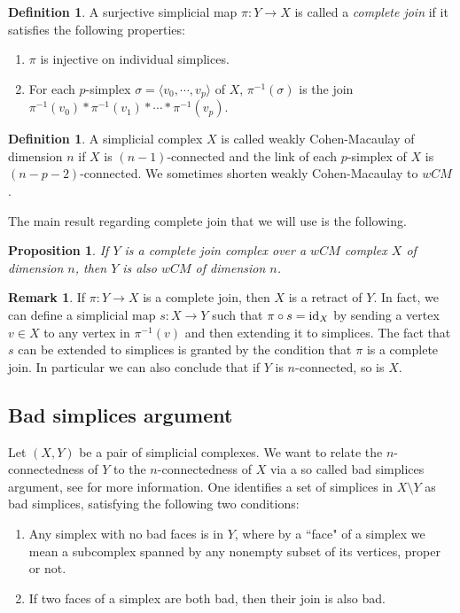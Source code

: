 \documentclass[11pt, a4paper]{amsart}
\newtheorem{prop}[thm]{Proposition}
\theoremstyle{definition}
\newtheorem{rem}[thm]{Remark}
\newtheorem{defn}[thm]{Definition} %
\newcommand{\id}{{{\rm id}}}
\begin{document}
\begin{defn}
A surjective simplicial map $\pi: Y\to X$ is called a \emph{complete join} if it satisfies the following properties:
\begin{enumerate} [label=(\arabic*)]
    \item $\pi$ is injective on individual simplices. 
    \item For each $p$-simplex $\sigma = \langle v_0,\cdots,v_p\rangle$ of $X$, $\pi^{-1}(\sigma)$ is the join $\pi^{-1}(v_0)\ast \pi^{-1}(v_1)\ast\cdots\ast \pi^{-1}(v_p)$.
 \end{enumerate}
\end{defn}


\begin{defn}
A simplicial complex  $X$ is called weakly Cohen-Macaulay of dimension $n$ if $X$ is $(n-1)$-connected and the link of each $p$-simplex of $X$ is $(n-p-2)$-connected. We sometimes shorten  weakly Cohen-Macaulay to $wCM$. 
\end{defn}

The main result regarding complete join that we will use is the following.

\begin{prop}\cite[Propostion 3.5]{HW10} \label{prop-join-conn}
If $Y$ is a complete join complex over a  $wCM$ complex $X$ of dimension $n$, then $Y$ is also  $wCM$ of dimension $n$.
\end{prop}

\begin{rem}\label{rem-cjoin}
If $\pi: Y\to X$ is a complete join, then $X$ is a retract of $Y$. In fact, we can define a simplicial map $s:X\to Y$ such that $\pi\circ s = \id_X$ by sending a vertex $v\in X$ to any vertex in $\pi^{-1}(v)$ and then extending it to simplices. The fact that $s$ can be extended to simplices is granted by the condition that $\pi$ is a complete join.  In particular we can also conclude that if $Y$ is $n$-connected, so is $X$.
\end{rem}

\subsection{Bad simplices argument}\label{sub-bad-sim}
Let $(X,Y)$ be a pair of simplicial complexes. We want to relate the $n$-connectedness of $Y$ to the $n$-connectedness of $X$ via a so called bad simplices argument, see \cite[Section 2.1]{HV17} for more information. One identifies a set of simplices in $X \setminus Y$ as bad simplices, satisfying the following two conditions:
\begin{enumerate}  [label=(\roman*)]
    \item \label{bad-sim-1} Any simplex with no bad faces is in $Y$, where by a ``face" of a simplex we mean a subcomplex spanned by any nonempty subset of its vertices, proper or not.
    \item \label{bad-sim-2} If two faces of a simplex are both bad, then their join is also bad.
\end{enumerate}
\end{document}
